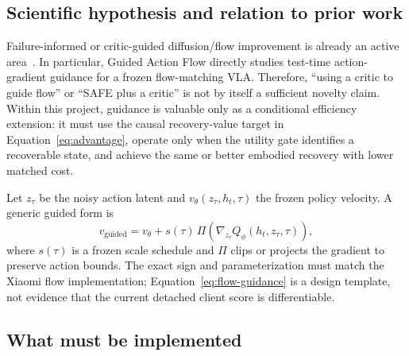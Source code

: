 

\subsection{Scientific hypothesis and relation to prior work}

Failure-informed or critic-guided diffusion/flow improvement is already an active area~\cite{afil,rover,qvgm,checkvla,guidedactionflow}. In particular, Guided Action Flow directly studies test-time action-gradient guidance for a frozen flow-matching VLA. Therefore, ``using a critic to guide flow'' or ``SAFE plus a critic'' is not by itself a sufficient novelty claim. Within this project, guidance is valuable only as a conditional efficiency extension: it must use the causal recovery-value target in Equation~\eqref{eq:advantage}, operate only when the utility gate identifies a recoverable state, and achieve the same or better embodied recovery with lower matched cost.

Let $z_{\tau}$ be the noisy action latent and $v_{\theta}(z_{\tau},h_t,\tau)$ the frozen policy velocity. A generic guided form is
\begin{equation}
  v_{\mathrm{guided}}
  = v_{\theta}
  +s(\tau)\,\Pi\!(
    \nabla_{z_{\tau}}Q_{\phi}(h_t,z_{\tau},\tau)
  ),
  \label{eq:flow-guidance}
\end{equation}
where $s(\tau)$ is a frozen scale schedule and $\Pi$ clips or projects the gradient to preserve action bounds. The exact sign and parameterization must match the Xiaomi flow implementation; Equation~\eqref{eq:flow-guidance} is a design template, not evidence that the current detached client score is differentiable.

\subsection{What must be implemented}

